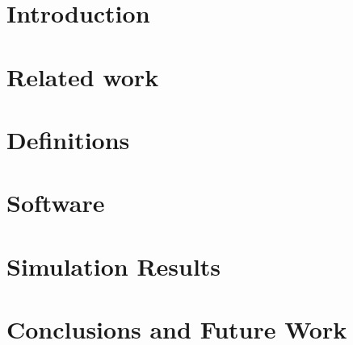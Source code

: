 \documentclass[runningheads]{llncs}
\begin{document}
\section{Introduction}
\label{sec:intro}


\section{Related work}
\label{sec:related}


\section{Definitions}
\label{sec:defs}


\section{Software}
\label{sec:software}


\section{Simulation Results}
\label{sec:results}


\section{Conclusions and Future Work}
\label{sec:conc}



%
%
%


%
\end{document}
